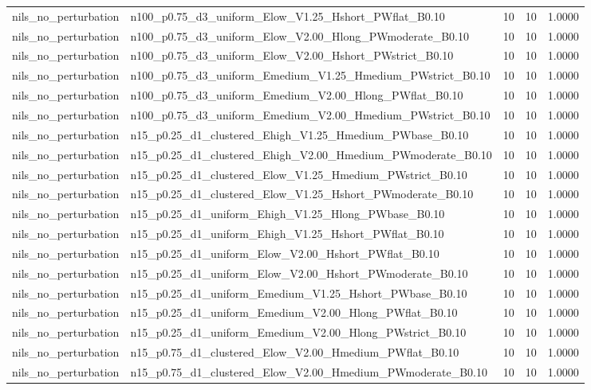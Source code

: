 \begin{tabular}{llrrr}
nils_no_perturbation & n100_p0.75_d3_uniform_Elow_V1.25_Hshort_PWflat_B0.10 & 10 & 10 & 1.0000 \\
nils_no_perturbation & n100_p0.75_d3_uniform_Elow_V2.00_Hlong_PWmoderate_B0.10 & 10 & 10 & 1.0000 \\
nils_no_perturbation & n100_p0.75_d3_uniform_Elow_V2.00_Hshort_PWstrict_B0.10 & 10 & 10 & 1.0000 \\
nils_no_perturbation & n100_p0.75_d3_uniform_Emedium_V1.25_Hmedium_PWstrict_B0.10 & 10 & 10 & 1.0000 \\
nils_no_perturbation & n100_p0.75_d3_uniform_Emedium_V2.00_Hlong_PWflat_B0.10 & 10 & 10 & 1.0000 \\
nils_no_perturbation & n100_p0.75_d3_uniform_Emedium_V2.00_Hmedium_PWstrict_B0.10 & 10 & 10 & 1.0000 \\
nils_no_perturbation & n15_p0.25_d1_clustered_Ehigh_V1.25_Hmedium_PWbase_B0.10 & 10 & 10 & 1.0000 \\
nils_no_perturbation & n15_p0.25_d1_clustered_Ehigh_V2.00_Hmedium_PWmoderate_B0.10 & 10 & 10 & 1.0000 \\
nils_no_perturbation & n15_p0.25_d1_clustered_Elow_V1.25_Hmedium_PWstrict_B0.10 & 10 & 10 & 1.0000 \\
nils_no_perturbation & n15_p0.25_d1_clustered_Elow_V1.25_Hshort_PWmoderate_B0.10 & 10 & 10 & 1.0000 \\
nils_no_perturbation & n15_p0.25_d1_uniform_Ehigh_V1.25_Hlong_PWbase_B0.10 & 10 & 10 & 1.0000 \\
nils_no_perturbation & n15_p0.25_d1_uniform_Ehigh_V1.25_Hshort_PWflat_B0.10 & 10 & 10 & 1.0000 \\
nils_no_perturbation & n15_p0.25_d1_uniform_Elow_V2.00_Hshort_PWflat_B0.10 & 10 & 10 & 1.0000 \\
nils_no_perturbation & n15_p0.25_d1_uniform_Elow_V2.00_Hshort_PWmoderate_B0.10 & 10 & 10 & 1.0000 \\
nils_no_perturbation & n15_p0.25_d1_uniform_Emedium_V1.25_Hshort_PWbase_B0.10 & 10 & 10 & 1.0000 \\
nils_no_perturbation & n15_p0.25_d1_uniform_Emedium_V2.00_Hlong_PWflat_B0.10 & 10 & 10 & 1.0000 \\
nils_no_perturbation & n15_p0.25_d1_uniform_Emedium_V2.00_Hlong_PWstrict_B0.10 & 10 & 10 & 1.0000 \\
nils_no_perturbation & n15_p0.75_d1_clustered_Elow_V2.00_Hmedium_PWflat_B0.10 & 10 & 10 & 1.0000 \\
nils_no_perturbation & n15_p0.75_d1_clustered_Elow_V2.00_Hmedium_PWmoderate_B0.10 & 10 & 10 & 1.0000 \\

\end{tabular}
